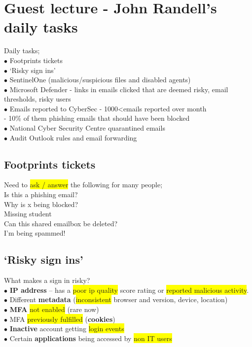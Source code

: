 \documentclass[tikz,border=10pt]{project_plan}
\newcommand{\bulletPoint}{\hspace{-3.1pt}$\bullet$ \hspace{5pt}}
\begin{document}
\chapter{Guest lecture - John Randell's daily tasks}

Daily tasks;\\
\bulletPoint Footprints tickets\\
\bulletPoint ‘Risky sign ins’\\
\bulletPoint SentinelOne (malicious/suspicious files and disabled agents)\\
\bulletPoint Microsoft Defender - links in emails clicked that are deemed risky, email thresholds, risky users\\
\bulletPoint Emails reported to CyberSec - 1000\textless emails reported over month\\
- 10\% of them phishing emails that should have been blocked\\
\bulletPoint National Cyber Security Centre quarantined emails\\
\bulletPoint Audit Outlook rules and email forwarding

\section{Footprints tickets}

Need to \colorbox{yellow}{ask / answer} the following for many people;\\
Is this a phishing email?\\
Why is x being blocked?\\
Missing student\\
Can this shared emailbox be deleted?\\
I’m being spammed!

\section{‘Risky sign ins’}

What makes a sign in risky?\\
\bulletPoint \textbf{IP address} – has a \colorbox{yellow}{poor ip quality} score rating or \colorbox{yellow}{reported malicious activity}.\\
\bulletPoint Different \textbf{metadata} (\colorbox{yellow}{inconsistent} browser and version, device, location)\\
\bulletPoint \textbf{MFA} \colorbox{yellow}{not enabled} (rare now)\\
\bulletPoint MFA \colorbox{yellow}{previously fulfilled} (\textbf{cookies})\\
\bulletPoint \textbf{Inactive} account getting \colorbox{yellow}{login events}\\
\bulletPoint Certain \textbf{applications} being accessed by \colorbox{yellow}{non IT users}
\end{document}
